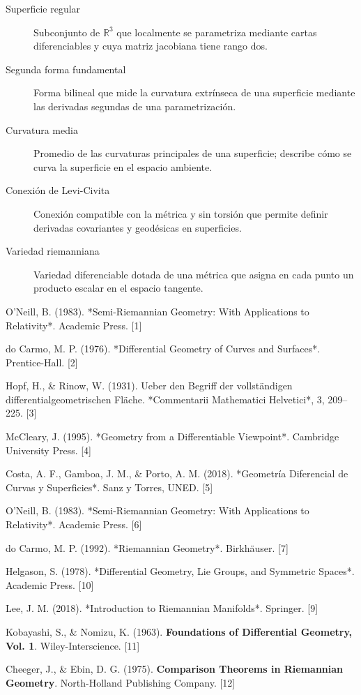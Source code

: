 \documentclass[12pt, a4paper]{report}
\theoremstyle{miestilo}
\theoremstyle{midefinicion}
\begin{document}
\begin{description}
  \item[Superficie regular] Subconjunto de $\mathbb{R}^3$ que localmente se parametriza mediante cartas diferenciables y cuya matriz jacobiana tiene rango dos.
  \item[Segunda forma fundamental] Forma bilineal que mide la curvatura extrínseca de una superficie mediante las derivadas segundas de una parametrización.
  \item[Curvatura media] Promedio de las curvaturas principales de una superficie; describe cómo se curva la superficie en el espacio ambiente.
  \item[Conexión de Levi-Civita] Conexión compatible con la métrica y sin torsión que permite definir derivadas covariantes y geodésicas en superficies.
  \item[Variedad riemanniana] Variedad diferenciable dotada de una métrica que asigna en cada punto un producto escalar en el espacio tangente.
\end{description}

\begin{thebibliography}{9}

O'Neill, B. (1983). *Semi-Riemannian Geometry: With Applications to Relativity*. Academic Press. [1]

do Carmo, M. P. (1976). *Differential Geometry of Curves and Surfaces*. Prentice-Hall. [2]

Hopf, H., \& Rinow, W. (1931). Ueber den Begriff der vollständigen differentialgeometrischen Fläche. *Commentarii Mathematici Helvetici*, 3, 209–225. [3]

McCleary, J. (1995). *Geometry from a Differentiable Viewpoint*. Cambridge University Press. [4]

Costa, A. F., Gamboa, J. M., \& Porto, A. M. (2018). *Geometría Diferencial de Curvas y Superficies*. Sanz y Torres, UNED. [5]

O'Neill, B. (1983). *Semi-Riemannian Geometry: With Applications to Relativity*. Academic Press. [6]

do Carmo, M. P. (1992). *Riemannian Geometry*. Birkhäuser. [7]

Helgason, S. (1978). *Differential Geometry, Lie Groups, and Symmetric Spaces*. Academic Press. [10]

Lee, J. M. (2018). *Introduction to Riemannian Manifolds*. Springer. [9]

Kobayashi, S., & Nomizu, K. (1963). \textbf{Foundations of Differential Geometry, Vol. 1}. Wiley-Interscience. [11]

Cheeger, J., & Ebin, D. G. (1975). \textbf{Comparison Theorems in Riemannian Geometry}. North-Holland Publishing Company. [12]

\end{thebibliography}
\end{document}
